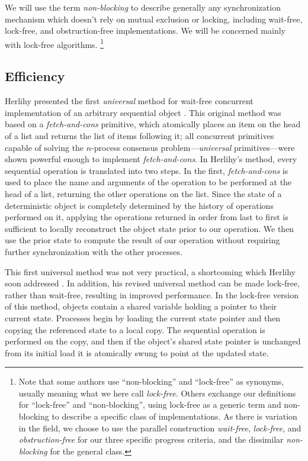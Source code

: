 We will use the term \emph{non-blocking} to describe
generally any synchronization mechanism which doesn't rely on mutual
exclusion or locking, including wait-free, lock-free,
and obstruction-free implementations.
We will be concerned mainly with lock-free algorithms.%
\footnote{Note that some authors use ``non-blocking'' and
  ``lock-free'' as synonyms, usually meaning what we here call
  \emph{lock-free}.  Others exchange our definitions for ``lock-free''
  and ``non-blocking'', using lock-free as a generic term and non-blocking
  to describe a specific class of implementations.  As there is
  variation in the field, we choose to use the parallel construction
  \emph{wait-free}, \emph{lock-free}, and \emph{obstruction-free} for
  our three specific progress criteria, and the dissimilar
  \emph{non-blocking} for the general class.}

\subsection{Efficiency}\label{sec:efficiency}
Herlihy presented the first \emph{universal} method for wait-free
concurrent implementation of an arbitrary sequential object
\cite{Herlihy88,Herlihy91}.  This original method was based on
a \emph{fetch-and-cons} primitive, which atomically places
an item on the head of a list and returns the list of items following
it; all concurrent primitives capable of solving the
$n$-process consensus problem---\emph{universal} primitives---were
shown powerful enough to implement \emph{fetch-and-cons}.
In Herlihy's method, 
every sequential operation is translated into two steps.  In the first,
\emph{fetch-and-cons} is used to place the name and arguments of the
operation to be performed
at the head of a list, returning the other operations on the list.
Since the state
of a deterministic object is completely determined by the history of
operations performed on it, applying the operations returned
in order from last to first is sufficient to locally reconstruct the
object state 
prior to our operation.
We then use the prior state to compute the result of our operation
without requiring further synchronization with the other processes.

This first universal method was not very practical, a shortcoming
which Herlihy soon addressed \cite{Herlihy93}.  In addition, his revised universal
method can be made lock-free, rather than wait-free, resulting in
improved performance.  In the lock-free version of this method,
objects contain a shared variable
holding a pointer to their current state.  Processes begin by loading
the current state pointer and then copying the referenced state to a
local copy.  The sequential operation is performed on the
copy, and then if the object's shared state pointer is unchanged from
its initial load it is atomically swung to point at the updated state.

